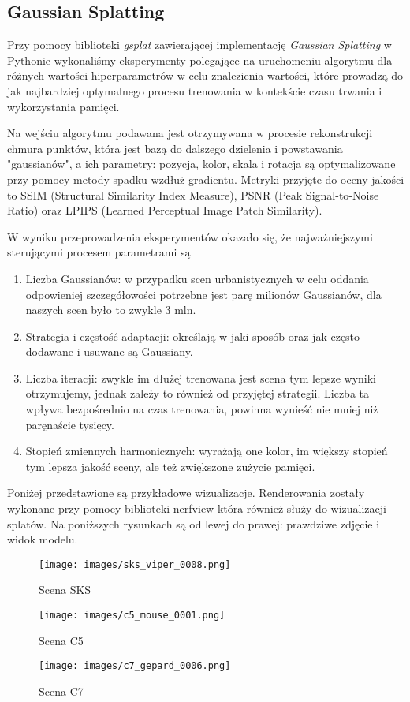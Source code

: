 \subsection{Gaussian Splatting}
Przy pomocy biblioteki \textit{gsplat}\cite{ye2024gsplatopensourcelibrarygaussian} zawierającej implementację \textit{Gaussian Splatting} w Pythonie wykonaliśmy eksperymenty polegające na uruchomeniu algorytmu dla różnych wartości hiperparametrów w celu znalezienia wartości, które prowadzą do jak najbardziej optymalnego procesu trenowania w kontekście czasu trwania i wykorzystania pamięci. 

Na wejściu algorytmu podawana jest otrzymywana w procesie rekonstrukcji chmura punktów, która jest bazą do dalszego dzielenia i powstawania "gaussianów", a ich parametry: pozycja, kolor, skala i rotacja są optymalizowane przy pomocy metody spadku wzdłuż gradientu. Metryki przyjęte do oceny jakości to SSIM (Structural Similarity Index Measure), PSNR (Peak Signal-to-Noise Ratio) oraz LPIPS (Learned Perceptual Image Patch Similarity).

W wyniku przeprowadzenia eksperymentów okazało się, że najważniejszymi sterującymi procesem parametrami są 
\begin{enumerate}
    \item Liczba Gaussianów: w przypadku scen urbanistycznych w celu oddania odpowieniej szczegółowości potrzebne jest parę milionów Gaussianów, dla naszych scen było to zwykle 3 mln.
    \item Strategia i częstość adaptacji: określają w jaki sposób oraz jak często dodawane i usuwane są Gaussiany. 
    \item Liczba iteracji: zwykle im dłużej trenowana jest scena tym lepsze wyniki otrzymujemy, jednak zależy to również od przyjętej strategii. Liczba ta wpływa bezpośrednio na czas trenowania, powinna wynieść nie mniej niż paręnaście tysięcy.
    \item Stopień zmiennych harmonicznych: wyrażają one kolor, im większy stopień tym lepsza jakość sceny, ale też zwiększone zużycie pamięci.  
\end{enumerate}

Poniżej przedstawione są przykładowe wizualizacje. Renderowania zostały wykonane przy pomocy biblioteki nerfview która również służy do wizualizacji splatów. Na poniższych rysunkach są od lewej do prawej: prawdziwe zdjęcie i widok modelu.

\begin{figure}[!h]
    \centering
    \texttt{[image: images/sks\_viper\_0008.png]}
    \caption{Scena SKS}
    \label{fig:sks_gs}
\end{figure}

\begin{figure}[!h]
    \centering
    \texttt{[image: images/c5\_mouse\_0001.png]}
    \caption{Scena C5}
    \label{fig:c5_gs}
\end{figure}

\begin{figure}[!h]
    \centering
    \texttt{[image: images/c7\_gepard\_0006.png]}
    \caption{Scena C7}
    \label{fig:c7_gs}
\end{figure}